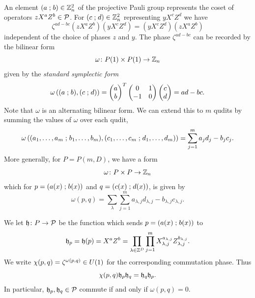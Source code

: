 \documentclass[11pt]{amsart}
\begin{document}
An element $(a  \mathrel{;}  b) \in \mathbb{Z}_n^2$ of the projective Pauli group represents the coset of operators $z X^a Z^b \in \mathcal{P}$. For $(c  \mathrel{;}  d)\in \mathbb{Z}_n^2$ representing $y X^cZ^d$ we have
\[ \zeta^{ad-bc} (z X^a Z^b ) (y X^cZ^d) = (y X^cZ^d) (z X^a Z^b )\]
independent of the choice of phases $z$ and $y$.
The phase $\zeta^{ad-bc}$ can be recorded by the bilinear form
\[\omega \colon P(1)  \times P(1)  \to \mathbb{Z}_n\]
given by the \emph{standard symplectic form}
\[ \omega\left( (a  \mathrel{;}  b), (c  \mathrel{;}  d) \right) = \begin{pmatrix} a \\ b \end{pmatrix}^T \begin{pmatrix} 0 & 1 \\ -1 & 0 \end{pmatrix} \begin{pmatrix} c \\ d \end{pmatrix} = ad-bc.\]
 Note that $\omega$ is an alternating bilinear form.  We can extend this to $m$ qudits by summing the values of $\omega$ over each qudit,
 \[\omega\left( (a_1,\ldots, a_m  \mathrel{;}  b_1,\ldots,b_m) ,  (c_1,\ldots, c_m  \mathrel{;}  d_1,\ldots,d_m) \right) = \sum_{j=1}^m a_{j}d_{j} - b_{j}c_{j}  .\]
 More generally, for $P = P(m,D)$, we have a form
 \[\omega \colon P \times P \to \mathbb{Z}_n\]
which for $p=(a(x) \mathrel{;} b(x))$ and $q=(c(x) \mathrel{;} d(x))$, is given by
 \[\omega(p,q) =\sum_\lambda \sum_{j=1}^m a_{\lambda,j}d_{\lambda,j} - b_{\lambda,j}c_{\lambda,j}  .\]

We let $\mathfrak{h} \colon P \to \mathcal{P}$ be the function which sends $p=(a(x) \mathrel{;} b(x))$ to
\[\mathfrak{h}_p=\mathfrak{h}(p) = X^{a}Z^{b}= \prod_{\lambda \in \mathbb{Z}^D}\prod_{j=1}^m X_{\lambda,j}^{a_{\lambda, j}} Z_{\lambda,j}^{b_{\lambda, j}} .\]
We write $\chi(p,q)=\zeta^{\omega(p,q)}\in U(1)$ for the corresponding commutation phase. Thus
\[ \chi(p,q)\mathfrak{h}_p\mathfrak{h}_q=\mathfrak{h}_q\mathfrak{h}_p.\]
In particular, $\mathfrak{h}_p,\mathfrak{h}_q \in \mathcal{P}$ commute if and only if $\omega(p,q) =0$.
\end{document}
